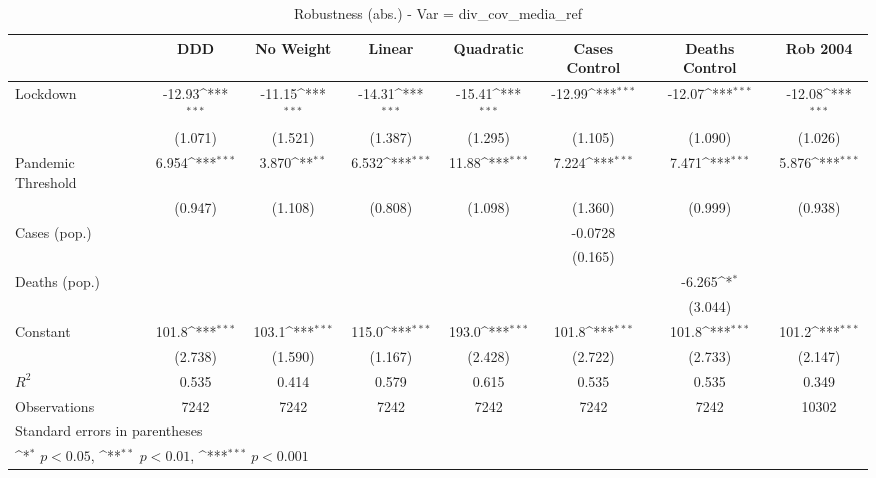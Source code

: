 \documentclass{article}
\begin{document}
{
\def\sym#1{\ifmmode^{#1}\else\(^{#1}\)\fi}
\begin{longtable}{l*{7}{c}}
\caption{Robustness (abs.) - Var = div\_cov\_media\_ref}\\
\hline\hline\endfirsthead\hline\endhead\hline\endfoot\endlastfoot
                &\multicolumn{1}{c}{DDD}&\multicolumn{1}{c}{No Weight}&\multicolumn{1}{c}{Linear}&\multicolumn{1}{c}{Quadratic}&\multicolumn{1}{c}{Cases Control}&\multicolumn{1}{c}{Deaths Control}&\multicolumn{1}{c}{Rob 2004}\\
\hline
Lockdown        &   -12.93\sym{***}&   -11.15\sym{***}&   -14.31\sym{***}&   -15.41\sym{***}&   -12.99\sym{***}&   -12.07\sym{***}&   -12.08\sym{***}\\
                &  (1.071)         &  (1.521)         &  (1.387)         &  (1.295)         &  (1.105)         &  (1.090)         &  (1.026)         \\
Pandemic Threshold&    6.954\sym{***}&    3.870\sym{**} &    6.532\sym{***}&    11.88\sym{***}&    7.224\sym{***}&    7.471\sym{***}&    5.876\sym{***}\\
                &  (0.947)         &  (1.108)         &  (0.808)         &  (1.098)         &  (1.360)         &  (0.999)         &  (0.938)         \\
Cases (pop.)    &                  &                  &                  &                  &  -0.0728         &                  &                  \\
                &                  &                  &                  &                  &  (0.165)         &                  &                  \\
Deaths (pop.)   &                  &                  &                  &                  &                  &   -6.265\sym{*}  &                  \\
                &                  &                  &                  &                  &                  &  (3.044)         &                  \\
Constant        &    101.8\sym{***}&    103.1\sym{***}&    115.0\sym{***}&    193.0\sym{***}&    101.8\sym{***}&    101.8\sym{***}&    101.2\sym{***}\\
                &  (2.738)         &  (1.590)         &  (1.167)         &  (2.428)         &  (2.722)         &  (2.733)         &  (2.147)         \\
\hline
\(R^{2}\)       &    0.535         &    0.414         &    0.579         &    0.615         &    0.535         &    0.535         &    0.349         \\
Observations    &     7242         &     7242         &     7242         &     7242         &     7242         &     7242         &    10302         \\
\hline\hline
\multicolumn{8}{l}{\footnotesize Standard errors in parentheses}\\
\multicolumn{8}{l}{\footnotesize \sym{*} \(p<0.05\), \sym{**} \(p<0.01\), \sym{***} \(p<0.001\)}\\
\end{longtable}
}
\end{document}
